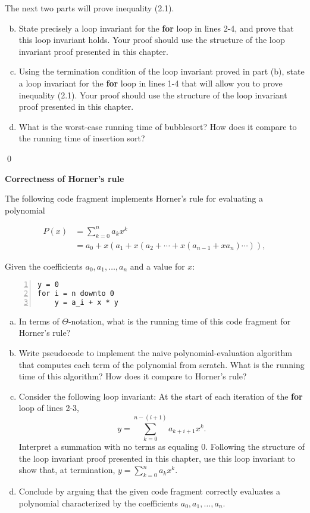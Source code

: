 The next two parts will prove inequality (2.1).

\begin{enumerate}[(a)]
    \setcounter{enumi}{1}
    \item State precisely a loop invariant for the \textbf{for} loop in lines 2-4, and prove that this loop invariant holds. Your proof should use the structure of the loop invariant proof presented in this chapter.
    \item Using the termination condition of the loop invariant proved in part (b), state a loop invariant for the \textbf{for} loop in lines 1-4 that will allow you to prove inequality (2.1). Your proof should use the structure of the loop invariant proof presented in this chapter.
    \item What is the worst-case running time of bubblesort? How does it compare to the running time of insertion sort?
\end{enumerate}

\sol \qed

 \textbf{Correctness of Horner's rule}

The following code fragment implements Horner's rule for evaluating a polynomial

\begin{align*}
    P(x) &= \sum_{k=0}^n a_k x^k \\
    &= a_0 + x(a_1 + x(a_2 + \cdots + x(a_{n-1} + xa_n)\cdots )),
\end{align*}

Given the coefficients $a_0, a_1, \dots, a_n$ and a value for $x$:
\begin{Verbatim}[frame=single,numbers=left,samepage=true]
y = 0
for i = n downto 0
    y = a_i + x * y
\end{Verbatim}

\begin{enumerate}[(a)]
    \item In terms of $\Theta$-notation, what is the running time of this code fragment for Horner's rule?
    \item Write pseudocode to implement the naive polynomial-evaluation algorithm that computes each term of the polynomial from scratch. What is the running time of this algorithm? How does it compare to Horner's rule?
    \item Consider the following loop invariant: At the start of each iteration of the \textbf{for} loop of lines 2-3, $$y = \sum_{k=0}^{n - (i + 1)} a_{k+i+1}x^k.$$ Interpret a summation with no terms as equaling 0. Following the structure of the loop invariant proof presented in this chapter, use this loop invariant to show that, at termination, $y = \sum_{k=0}^n a_kx^k$.
    \item Conclude by arguing that the given code fragment correctly evaluates a polynomial characterized by the coefficients $a_0, a_1, \dots, a_n$.
\end{enumerate}

